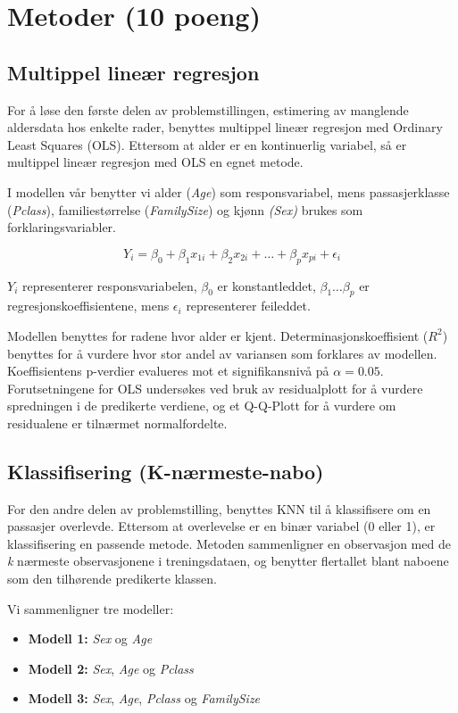 \section{Metoder (10 poeng)}\label{metoder-10-poeng}

\subsection{Multippel lineær regresjon} 
For å løse den første delen av problemstillingen, estimering av manglende aldersdata hos enkelte rader, benyttes multippel lineær regresjon med Ordinary Least Squares (OLS). Ettersom at alder er en kontinuerlig variabel, så er multippel lineær regresjon med OLS en egnet metode. %

I modellen vår benytter vi alder (\textit{Age}) som responsvariabel, mens passasjerklasse (\textit{Pclass}), familiestørrelse (\textit{FamilySize}) og kjønn \textit{(Sex)} brukes som forklaringsvariabler.

$$Y_i = \beta_0 + \beta_1 x_{1i} + \beta_2 x_{2i} + \dots + \beta_p x_{pi} + \epsilon_i$$

$Y_i$ representerer responsvariabelen, $\beta_0$ er konstantleddet, $\beta_1\dots\beta_p$ er regresjonskoeffisientene, mens $\epsilon_i$ representerer feileddet.

Modellen benyttes for radene hvor alder er kjent. Determinasjonskoeffisient ($R^2$) benyttes for å vurdere hvor stor andel av variansen som forklares av modellen. Koeffisientens p-verdier evalueres mot et signifikansnivå på $\alpha = 0.05$. Forutsetningene for OLS undersøkes ved bruk av residualplott for å vurdere spredningen i de predikerte verdiene, og et Q-Q-Plott for å vurdere om residualene er tilnærmet normalfordelte.

\subsection{Klassifisering (K-nærmeste-nabo)}
For den andre delen av problemstilling, benyttes KNN til å klassifisere om en passasjer overlevde. Ettersom at overlevelse er en binær variabel (0 eller 1), er klassifisering en passende metode. Metoden sammenligner en observasjon med de \textit{k} nærmeste observasjonene i treningsdataen, og benytter flertallet blant naboene som den tilhørende predikerte klassen. %

Vi sammenligner tre modeller:
\begin{itemize}
    \item \textbf{Modell 1:} \textit{Sex} og \textit{Age}
    \item \textbf{Modell 2:} \textit{Sex}, \textit{Age} og \textit{Pclass}
    \item \textbf{Modell 3:} \textit{Sex}, \textit{Age}, \textit{Pclass} og \textit{FamilySize}
\end{itemize}

